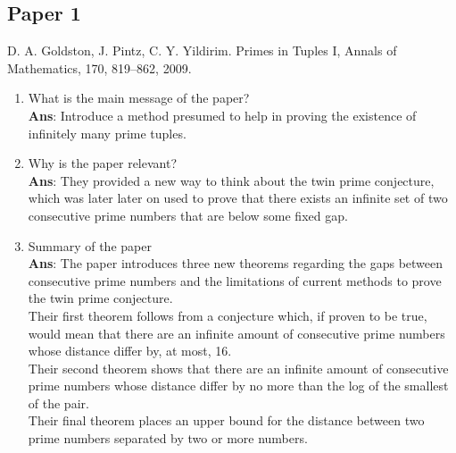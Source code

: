 \documentclass[11pt]{article}
\begin{document}
\subsection*{Paper 1}
D. A. Goldston, J. Pintz, C. Y. Yildirim. Primes in Tuples I, Annals of Mathematics, 170, 819–862, 2009.
\begin{enumerate}[label=(\alph*)]
	\item What is the main message of the paper? \\ \textbf{Ans}: Introduce a method presumed to help in proving the existence of infinitely many prime tuples.
	\item Why is the paper relevant? \\ \textbf{Ans}: They provided a new way to think about the twin prime conjecture, which was later later on used to prove that there exists an infinite set of two consecutive prime numbers that are below some fixed gap.
	\item Summary of the paper \\ \textbf{Ans}: The paper introduces three new theorems  regarding the gaps between consecutive prime numbers and the limitations of current methods to prove the twin prime conjecture.\\ Their first theorem follows from a conjecture which, if proven to be true, would mean that there are an infinite amount of consecutive prime numbers whose distance differ by, at most, 16.\\ Their second theorem shows that there are an infinite amount of consecutive prime numbers whose distance differ by no more than the log of the smallest of the pair.\\ Their final theorem places an upper bound for the distance between two prime numbers separated by two or more numbers.
\end{enumerate}
\end{document}
